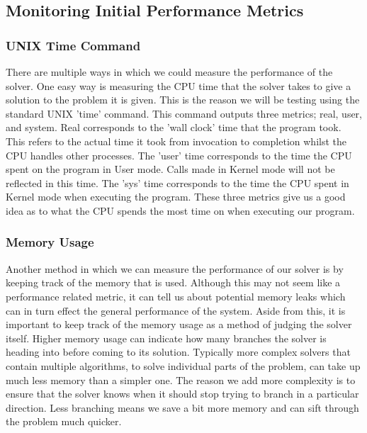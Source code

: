 \documentclass{article}
\begin{document}
\subsection{Monitoring Initial Performance Metrics}

\subsubsection{UNIX Time Command}
There are multiple ways in which we could measure the performance of the solver. One easy way is
measuring the CPU time that the solver takes to give a solution to the problem it is given. This is
the reason we will be testing using the standard UNIX 'time' command. This command outputs three
metrics; real, user, and system. Real corresponds to the 'wall clock' time that the program took.
This refers to the actual time it took from invocation to completion whilst the CPU handles other
processes. The 'user' time corresponds to the time the CPU spent on the program in User mode. Calls
made in Kernel mode will not be reflected in this time. The 'sys' time corresponds to the time the
CPU spent in Kernel mode when executing the program. These three metrics give us a good idea as to
what the CPU spends the most time on when executing our program.

\subsubsection{Memory Usage}
Another method in which we can measure the performance of our solver is by keeping track of the
memory that is used. Although this may not seem like a performance related metric, it can tell us
about potential memory leaks which can in turn effect the general performance of the system. Aside
from this, it is important to keep track of the memory usage as a method of judging the solver
itself. Higher memory usage can indicate how many branches the solver is heading into before coming
to its solution. Typically more complex solvers that contain multiple algorithms, to solve
individual parts of the problem, can take up much less memory than a simpler one. The reason we add
more complexity is to ensure that the solver knows when it should stop trying to branch in a
particular direction. Less branching means we save a bit more memory and can sift through the
problem much quicker.
\end{document}
